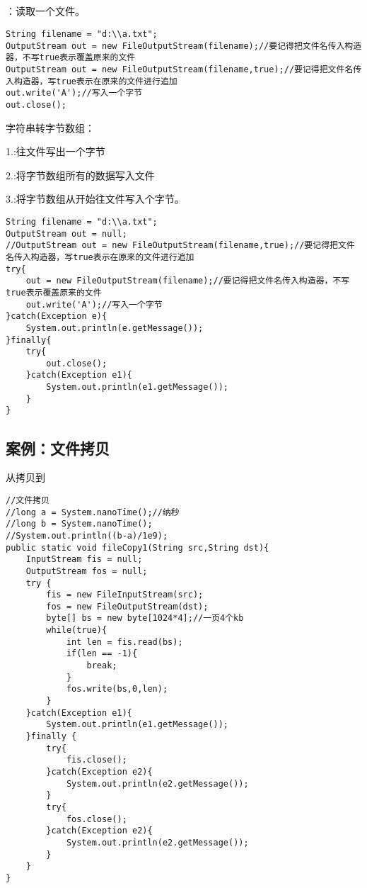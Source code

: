 \documentclass[a4paper]{report}
\begin{document}
\subsection{}
：读取一个文件。
\begin{lstlisting}
String filename = "d:\\a.txt";
OutputStream out = new FileOutputStream(filename);//要记得把文件名传入构造器，不写true表示覆盖原来的文件
OutputStream out = new FileOutputStream(filename,true);//要记得把文件名传入构造器，写true表示在原来的文件进行追加
out.write('A');//写入一个字节
out.close();
\end{lstlisting}

\begin{tips}

字符串转字节数组：

1.:往文件写出一个字节

2.:将字节数组所有的数据写入文件

3.:将字节数组从开始往文件写入个字节。
\end{tips}

\begin{lstlisting}[title=异常处理]
String filename = "d:\\a.txt";
OutputStream out = null;
//OutputStream out = new FileOutputStream(filename,true);//要记得把文件名传入构造器，写true表示在原来的文件进行追加
try{
    out = new FileOutputStream(filename);//要记得把文件名传入构造器，不写true表示覆盖原来的文件
    out.write('A');//写入一个字节
}catch(Exception e){
    System.out.println(e.getMessage());
}finally{
    try{
        out.close();
    }catch(Exception e1){
        System.out.println(e1.getMessage());
    }
}

\end{lstlisting}
\subsection{案例：文件拷贝}
从拷贝到
\begin{lstlisting}[title=版本1]
//文件拷贝
//long a = System.nanoTime();//纳秒
//long b = System.nanoTime();
//System.out.println((b-a)/1e9);
public static void fileCopy1(String src,String dst){
    InputStream fis = null;
    OutputStream fos = null;
    try {
        fis = new FileInputStream(src);
        fos = new FileOutputStream(dst);
        byte[] bs = new byte[1024*4];//一页4个kb
        while(true){
            int len = fis.read(bs);
            if(len == -1){
                break;
            }
            fos.write(bs,0,len);
        }
    }catch(Exception e1){
        System.out.println(e1.getMessage());
    }finally {
        try{
            fis.close();
        }catch(Exception e2){
            System.out.println(e2.getMessage());
        }
        try{
            fos.close();
        }catch(Exception e2){
            System.out.println(e2.getMessage());
        }
    }
}
\end{lstlisting}
\end{document}
